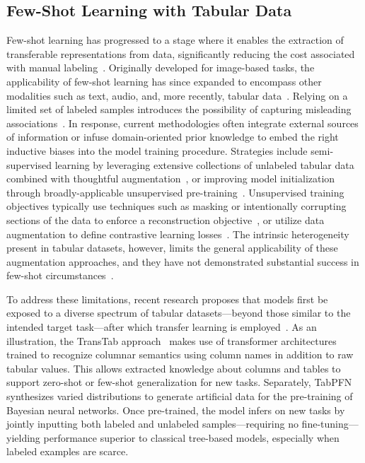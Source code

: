\subsection{Few-Shot Learning with Tabular Data}
Few-shot learning has progressed to a stage where it enables the extraction of transferable representations from data, significantly reducing the cost associated with manual labeling~\cite{chen2018closer}. Originally developed for image-based tasks, the applicability of few-shot learning has since expanded to encompass other modalities such as text, audio, and, more recently, tabular data~\cite{majumder2022few,nam2023stunt,schick2021exploiting}. Relying on a limited set of labeled samples introduces the possibility of capturing misleading associations~\cite{bartlett2021deep}. In response, current methodologies often integrate external sources of information or infuse domain-oriented prior knowledge to embed the right inductive biases into the model training procedure. Strategies include semi-supervised learning by leveraging extensive collections of unlabeled tabular data combined with thoughtful augmentation~\cite{ucar2021subtab,yoon2020vime}, or improving model initialization through broadly-applicable unsupervised pre-training~\cite{somepalli2021saint}. Unsupervised training objectives typically use techniques such as masking or intentionally corrupting sections of the data to enforce a reconstruction objective~\cite{arik2021tabnet,majmundar2022met}, or utilize data augmentation to define contrastive learning losses~\cite{bahri2022scarf,chen2020simple}. The intrinsic heterogeneity present in tabular datasets, however, limits the general applicability of these augmentation approaches, and they have not demonstrated substantial success in few-shot circumstances~\cite{nam2023stunt}.

To address these limitations, recent research proposes that models first be exposed to a diverse spectrum of tabular datasets—beyond those similar to the intended target task—after which transfer learning is employed~\cite{zhang2023generative,levin2022transfer,zhu2023xtab}. As an illustration, the TransTab approach~\cite{wang2022transtab} makes use of transformer architectures trained to recognize columnar semantics using column names in addition to raw tabular values. This allows extracted knowledge about columns and tables to support zero-shot or few-shot generalization for new tasks. Separately, TabPFN~\cite{hollmann2022tabpfn} synthesizes varied distributions to generate artificial data for the pre-training of Bayesian neural networks. Once pre-trained, the model infers on new tasks by jointly inputting both labeled and unlabeled samples—requiring no fine-tuning—yielding performance superior to classical tree-based models, especially when labeled examples are scarce.

